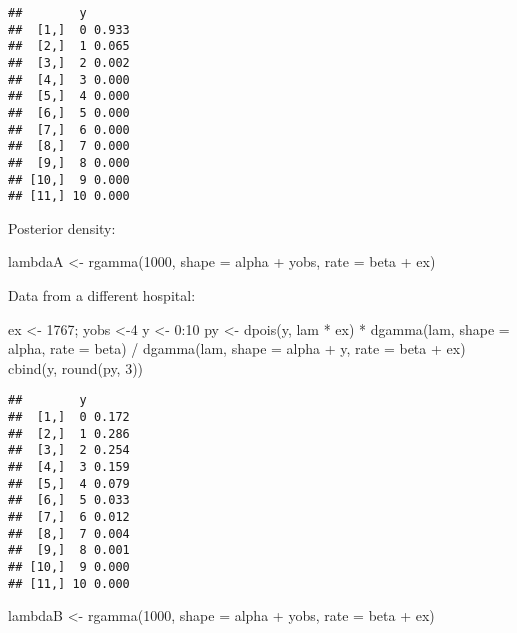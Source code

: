 \documentclass[
]{book}
\newenvironment{Shaded}{\begin{snugshade}}{\end{snugshade}}
\newcommand{\AttributeTok}[1]{\textcolor[rgb]{0.77,0.63,0.00}{#1}}
\newcommand{\DecValTok}[1]{\textcolor[rgb]{0.00,0.00,0.81}{#1}}
\newcommand{\FunctionTok}[1]{\textcolor[rgb]{0.00,0.00,0.00}{#1}}
\newcommand{\NormalTok}[1]{#1}
\newcommand{\OtherTok}[1]{\textcolor[rgb]{0.56,0.35,0.01}{#1}}
\newcommand{\SpecialCharTok}[1]{\textcolor[rgb]{0.00,0.00,0.00}{#1}}
\begin{document}
\begin{verbatim}
##        y      
##  [1,]  0 0.933
##  [2,]  1 0.065
##  [3,]  2 0.002
##  [4,]  3 0.000
##  [5,]  4 0.000
##  [6,]  5 0.000
##  [7,]  6 0.000
##  [8,]  7 0.000
##  [9,]  8 0.000
## [10,]  9 0.000
## [11,] 10 0.000
\end{verbatim}

Posterior density:

\begin{Shaded}
\begin{Highlighting}[]
\NormalTok{lambdaA }\OtherTok{\textless{}{-}} \FunctionTok{rgamma}\NormalTok{(}\DecValTok{1000}\NormalTok{, }\AttributeTok{shape =}\NormalTok{ alpha }\SpecialCharTok{+}\NormalTok{ yobs, }
                  \AttributeTok{rate =}\NormalTok{ beta }\SpecialCharTok{+}\NormalTok{ ex)}
\end{Highlighting}
\end{Shaded}

Data from a different hospital:

\begin{Shaded}
\begin{Highlighting}[]
\NormalTok{ex }\OtherTok{\textless{}{-}} \DecValTok{1767}\NormalTok{; yobs }\OtherTok{\textless{}{-}}\DecValTok{4}
\NormalTok{y }\OtherTok{\textless{}{-}} \DecValTok{0}\SpecialCharTok{:}\DecValTok{10}
\NormalTok{py }\OtherTok{\textless{}{-}} \FunctionTok{dpois}\NormalTok{(y, lam }\SpecialCharTok{*}\NormalTok{ ex) }\SpecialCharTok{*} 
  \FunctionTok{dgamma}\NormalTok{(lam, }\AttributeTok{shape =}\NormalTok{ alpha, }\AttributeTok{rate =}\NormalTok{ beta) }\SpecialCharTok{/}   
  \FunctionTok{dgamma}\NormalTok{(lam, }\AttributeTok{shape =}\NormalTok{ alpha }\SpecialCharTok{+}\NormalTok{ y, }\AttributeTok{rate =}\NormalTok{ beta }\SpecialCharTok{+}\NormalTok{ ex)}
 \FunctionTok{cbind}\NormalTok{(y, }\FunctionTok{round}\NormalTok{(py, }\DecValTok{3}\NormalTok{))}
\end{Highlighting}
\end{Shaded}

\begin{verbatim}
##        y      
##  [1,]  0 0.172
##  [2,]  1 0.286
##  [3,]  2 0.254
##  [4,]  3 0.159
##  [5,]  4 0.079
##  [6,]  5 0.033
##  [7,]  6 0.012
##  [8,]  7 0.004
##  [9,]  8 0.001
## [10,]  9 0.000
## [11,] 10 0.000
\end{verbatim}

\begin{Shaded}
\begin{Highlighting}[]
\NormalTok{lambdaB }\OtherTok{\textless{}{-}} \FunctionTok{rgamma}\NormalTok{(}\DecValTok{1000}\NormalTok{, }\AttributeTok{shape =}\NormalTok{ alpha }\SpecialCharTok{+}\NormalTok{ yobs,}
                  \AttributeTok{rate =}\NormalTok{ beta }\SpecialCharTok{+}\NormalTok{ ex)}
\end{Highlighting}
\end{Shaded}
\end{document}
